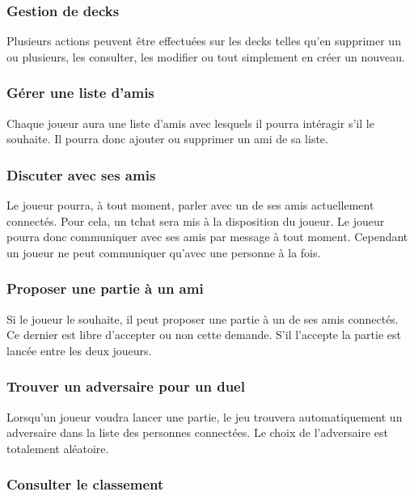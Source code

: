 \documentclass[11pt,a4paper]{article}
\begin{document}
\subsubsection*{Gestion de decks}

Plusieurs actions peuvent être effectuées sur les
decks telles qu'en supprimer un ou plusieurs, les consulter, les
modifier ou tout simplement en créer un nouveau.


\subsubsection*{Gérer une liste d'amis}

Chaque joueur aura une liste d'amis avec lesquels il pourra
intéragir s'il le souhaite. Il pourra donc ajouter ou supprimer un ami de sa liste.


\subsubsection*{Discuter avec ses amis}

Le joueur pourra, à tout moment, parler avec un de ses
amis actuellement connectés. Pour cela, un tchat sera mis à la 
disposition du joueur.  Le joueur pourra donc communiquer avec ses
amis par message à tout moment. Cependant un joueur ne peut communiquer qu'avec une personne à la fois.

\subsubsection*{Proposer une partie à un ami}

Si le joueur le souhaite, il peut proposer une partie à un de ses
amis connectés. Ce dernier est libre d'accepter ou non cette demande.
S'il l'accepte la partie est lancée entre les deux joueurs.


\subsubsection*{Trouver un adversaire pour un duel}

Lorsqu'un joueur voudra lancer une partie, le jeu trouvera
automatiquement un adversaire dans la liste des personnes
connectées. Le choix de l'adversaire est totalement aléatoire.


\subsubsection*{Consulter le classement}
\end{document}
